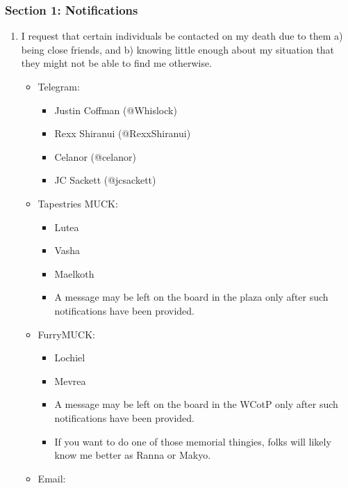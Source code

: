 \subsubsection*{Section 1: Notifications}\label{section-1-notifications}

\begin{enumerate}
\def\labelenumi{\arabic{enumi}.}
\tightlist
\item
  I request that certain individuals be contacted on my death due to them a) being close friends, and b) knowing little enough about my situation that they might not be able to find me otherwise.

  \begin{itemize}
  \tightlist
  \item
    Telegram:

    \begin{itemize}
    \tightlist
    \item
      Justin Coffman (@Whislock)
    \item
      Rexx Shiranui (@RexxShiranui)
    \item
      Celanor (@celanor)
    \item
      JC Sackett (@jcsackett)
    \end{itemize}
  \item
    Tapestries MUCK:

    \begin{itemize}
    \tightlist
    \item
      Lutea
    \item
      Vasha
    \item
      Maelkoth
    \item
      A message may be left on the board in the plaza only after such notifications have been provided.
    \end{itemize}
  \item
    FurryMUCK:

    \begin{itemize}
    \tightlist
    \item
      Lochiel
    \item
      Mevrea
    \item
      A message may be left on the board in the WCotP only after such notifications have been provided.
    \item
      If you want to do one of those memorial thingies, folks will likely know me better as Ranna or Makyo.
    \end{itemize}
  \item
    Email:


\end{itemize}
\end{enumerate}
